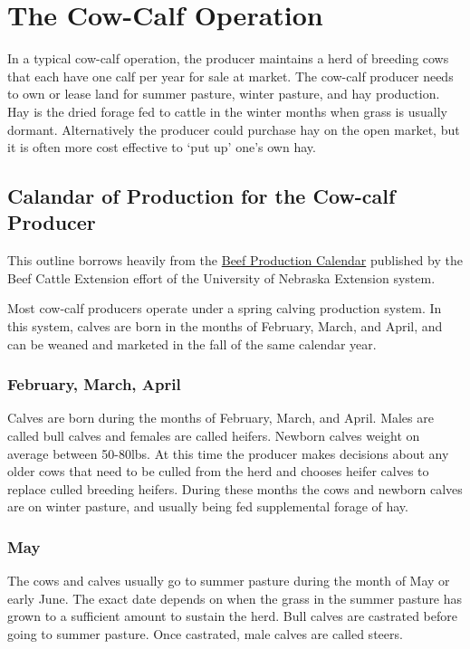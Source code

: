 \documentclass[
  letterpaper,
  DIV=11,
  numbers=noendperiod]{scrreprt}
\begin{document}
\section{The Cow-Calf Operation}\label{the-cow-calf-operation}

In a typical cow-calf operation, the producer maintains a herd of
breeding cows that each have one calf per year for sale at market. The
cow-calf producer needs to own or lease land for summer pasture, winter
pasture, and hay production. Hay is the dried forage fed to cattle in
the winter months when grass is usually dormant. Alternatively the
producer could purchase hay on the open market, but it is often more
cost effective to `put up' one's own hay.

\subsection{Calandar of Production for the Cow-calf
Producer}\label{calandar-of-production-for-the-cow-calf-producer}

This outline borrows heavily from the
\href{http://beef.unl.edu/beefprodcal.shtml}{Beef Production Calendar}
published by the Beef Cattle Extension effort of the University of
Nebraska Extension system.

Most cow-calf producers operate under a spring calving production
system. In this system, calves are born in the months of February,
March, and April, and can be weaned and marketed in the fall of the same
calendar year.

\subsubsection{February, March, April}\label{february-march-april}

Calves are born during the months of February, March, and April. Males
are called bull calves and females are called heifers. Newborn calves
weight on average between 50-80lbs. At this time the producer makes
decisions about any older cows that need to be culled from the herd and
chooses heifer calves to replace culled breeding heifers. During these
months the cows and newborn calves are on winter pasture, and usually
being fed supplemental forage of hay.

\subsubsection{May}\label{may}

The cows and calves usually go to summer pasture during the month of May
or early June. The exact date depends on when the grass in the summer
pasture has grown to a sufficient amount to sustain the herd. Bull
calves are castrated before going to summer pasture. Once castrated,
male calves are called steers.
\end{document}
